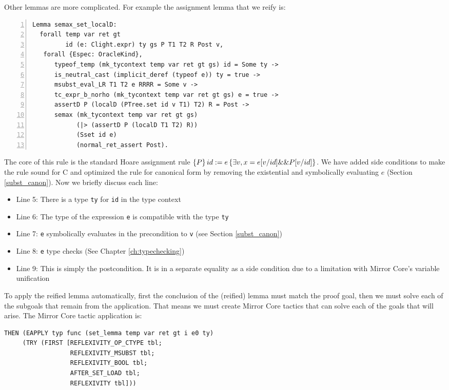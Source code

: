 \documentclass{puthesis}
\begin{document}
 Other lemmas are more
complicated. For example the assignment lemma that we reify is:

\begin{lstlisting}[numbers=left]
Lemma semax_set_localD:
  forall temp var ret gt 
         id (e: Clight.expr) ty gs P T1 T2 R Post v,
   forall {Espec: OracleKind},
      typeof_temp (mk_tycontext temp var ret gt gs) id = Some ty -> 
      is_neutral_cast (implicit_deref (typeof e)) ty = true ->
      msubst_eval_LR T1 T2 e RRRR = Some v ->
      tc_expr_b_norho (mk_tycontext temp var ret gt gs) e = true ->
      assertD P (localD (PTree.set id v T1) T2) R = Post ->
      semax (mk_tycontext temp var ret gt gs) 
            (|> (assertD P (localD T1 T2) R))
            (Sset id e)
            (normal_ret_assert Post).
\end{lstlisting}

The core of this rule is the standard Hoare assignment rule
$\{P\}\,id:=e\,\{\exists v, x=e[v/id] \&\& P[v/id]\}$. We have added side
conditions to make the rule sound for C and optimized the rule for
canonical form by removing the existential and symbolically evaluating
$e$ (Section \ref{subst_canon}). Now we briefly discuss each line:

\begin{itemize}
\item Line 5: There is a type \lstinline|ty| for \lstinline|id| in the type context
\item Line 6: The type of the expression \lstinline|e| is compatible
  with the type \lstinline|ty|
\item Line 7: \lstinline|e| symbolically evaluates in the precondition
  to \lstinline|v| (see Section \ref{subst_canon})
\item Line 8: \lstinline|e| type checks (See Chapter
  \ref{ch:typechecking})
\item Line 9: This is simply the postcondition. It is in a separate
  equality as a side condition due to a limitation with Mirror Core's
  variable unification
\end{itemize}

To apply the reified lemma automatically, first the conclusion of the (reified)
lemma must match the proof goal, then we must solve each of the
subgoals that remain from the application. That means we must create
Mirror Core tactics that can solve each of the goals that will
arise. The Mirror Core tactic application is:

\begin{lstlisting}
THEN (EAPPLY typ func (set_lemma temp var ret gt i e0 ty)
     (TRY (FIRST [REFLEXIVITY_OP_CTYPE tbl;
                  REFLEXIVITY_MSUBST tbl; 
                  REFLEXIVITY_BOOL tbl;
                  AFTER_SET_LOAD tbl;
                  REFLEXIVITY tbl]))
\end{lstlisting}
\end{document}
